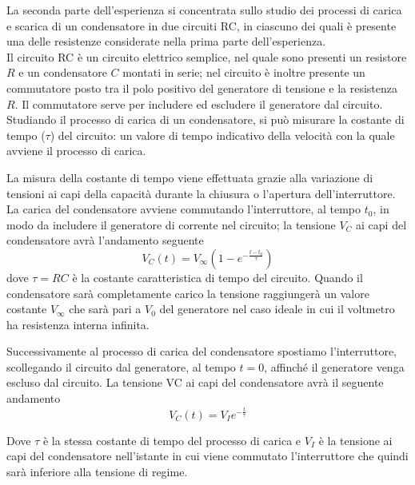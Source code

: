 \documentclass[italian, a4paper, 10pt, twocolumn]{../../style/lab_unige}
\begin{document}
    La seconda parte dell’esperienza si concentrata sullo studio dei processi di carica e scarica di un condensatore in due circuiti RC, in ciascuno dei quali è presente una delle resistenze considerate nella prima parte dell'esperienza. \\
    Il circuito RC è un circuito elettrico semplice, nel quale sono presenti un resistore $R$ e un condensatore $C$ montati in serie; nel circuito è inoltre presente un commutatore posto tra il polo positivo del generatore di tensione e la resistenza $R$. Il commutatore serve per includere ed escludere il generatore dal circuito. Studiando il processo di carica di un condensatore, si può misurare la costante di tempo ($\tau$) del circuito: un valore di tempo indicativo della velocità con la quale avviene il processo di carica.

    La misura della costante di tempo viene effettuata grazie alla variazione di tensioni ai capi della capacità durante la chiusura o l’apertura dell’interruttore.
    La carica del condensatore avviene commutando l’interruttore, al tempo $t_0$, in modo da includere il generatore di corrente nel circuito; la tensione $V_C$ ai capi del condensatore avrà l’andamento seguente
    \begin{equation}
        V_C(t)=V_\infty\left(1-e^{-\frac{t-t_0}{\tau}}\right) \label{equation:carica}
    \end{equation}
    dove $\tau=RC$ è la costante caratteristica di tempo del circuito. Quando il condensatore sarà completamente carico la tensione raggiungerà un valore costante $V_\infty$ che sarà pari a $V_0$ del generatore nel caso ideale in cui il voltmetro ha resistenza interna infinita.

    Successivamente al processo di carica del condensatore spostiamo l’interruttore, scollegando il circuito dal generatore, al tempo $t=0$, affinché il generatore venga escluso dal circuito.
    La tensione VC ai capi del condensatore avrà il seguente andamento
    \begin{equation}
        V_C(t) = V_Ie^{-\frac{t}{\tau}} \label{equation:scarica}
    \end{equation}

    Dove $\tau$ è la stessa costante di tempo del processo di carica e $V_I$ è la tensione ai capi del condensatore  nell’istante in cui viene commutato l’interruttore che quindi sarà inferiore alla tensione di regime.
\end{document}
